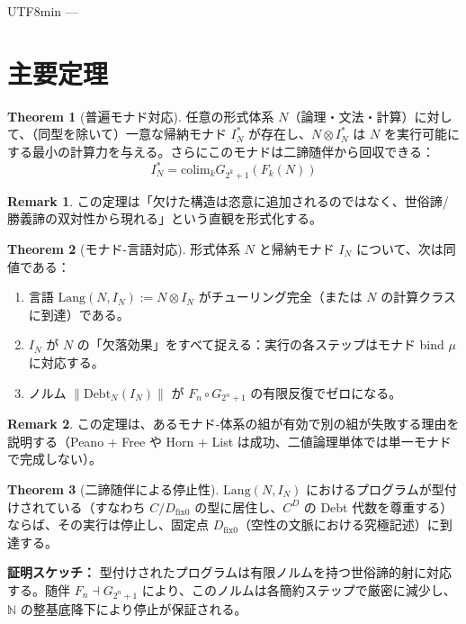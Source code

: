 \documentclass[a4paper,11pt]{article}
\renewcommand{\emph}[1]{\textbf{#1}}
\theoremstyle{definition}
\newtheorem{theorem}{Theorem}[section]
\newtheorem{remark}{Remark}[section]
\begin{document}
\begin{CJK}{UTF8}{min}
---

\section{主要定理}

\begin{theorem}[普遍モナド対応]
\label{thm:universal}
任意の形式体系 $N$（論理・文法・計算）に対して、（同型を除いて）一意な帰納モナド $I_N^*$ が存在し、$N \otimes I_N^*$ は $N$ を実行可能にする最小の計算力を与える。さらにこのモナドは二諦随伴から回収できる：
\[
  I_N^* = \text{colim}_{k} G_{2^k+1}(F_k(N))
\]
\end{theorem}

\begin{remark}
この定理は「欠けた構造は恣意に追加されるのではなく、世俗諦/勝義諦の双対性から現れる」という直観を形式化する。
\end{remark}

\begin{theorem}[モナド-言語対応]
\label{thm:correspondence}
形式体系 $N$ と帰納モナド $I_N$ について、次は同値である：

\begin{enumerate}
  \item 言語 $\text{Lang}(N, I_N) := N \otimes I_N$ がチューリング完全（または $N$ の計算クラスに到達）である。
  \item $I_N$ が $N$ の「欠落効果」をすべて捉える：実行の各ステップはモナド bind $\mu$ に対応する。
  \item ノルム $\|\text{Debt}_N(I_N)\|$ が $F_n \circ G_{2^n+1}$ の有限反復でゼロになる。
\end{enumerate}
\end{theorem}

\begin{remark}
この定理は、あるモナド-体系の組が有効で別の組が失敗する理由を説明する（Peano + Free や Horn + List は成功、二値論理単体では単一モナドで完成しない）。
\end{remark}

\begin{theorem}[二諦随伴による停止性]
\label{thm:termination}
$\text{Lang}(N, I_N)$ におけるプログラムが型付けされている（すなわち $C/D_{\mathrm{fix}0}$ の型に居住し、$C^D$ の Debt 代数を尊重する）ならば、その実行は停止し、固定点 $D_{\mathrm{fix}0}$（空性の文脈における究極記述）に到達する。

\emph{証明スケッチ：} 型付けされたプログラムは有限ノルムを持つ世俗諦的射に対応する。随伴 $F_n \dashv G_{2^n+1}$ により、このノルムは各簡約ステップで厳密に減少し、$\mathbb{N}$ の整基底降下により停止が保証される。
\end{theorem}


\end{CJK}
\end{document}
